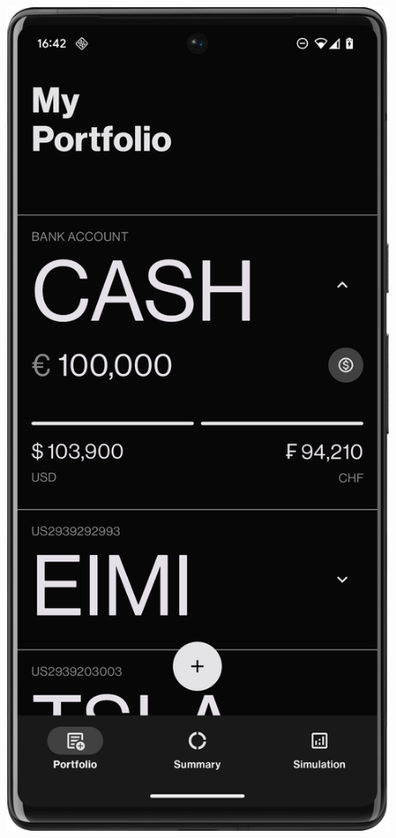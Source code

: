 \begin{figure}[H]
\begin{minipage}{0.24\textwidth}
        \label{fig:portfolio_card}
    \end{minipage}
    \hfill
    \begin{minipage}{0.24\textwidth}
        \centering
        \includegraphics[width=\textwidth]{foto/cash_card}

\end{minipage}
\end{figure}
